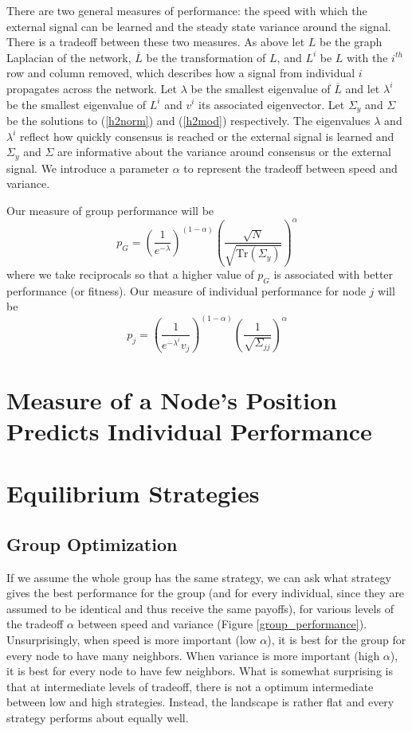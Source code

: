 \documentclass{article}
\newcommand{\Tr}{\text{Tr}}
\begin{document}
There are two general measures of performance: the speed with which the external signal can be learned and the steady state variance around the signal.  There is a tradeoff between these two measures.  As above let $L$ be the graph Laplacian of the network, $\overline{L}$ be the transformation of $L$, and $L^i$ be $L$ with the $i^{th}$ row and column removed, which describes how  a signal from individual $i$ propagates across the network.  Let $\lambda$ be the smallest eigenvalue of $\overline{L}$ and let $\lambda^i$ be the smallest eigenvalue of $L^i$ and $v^i$ its associated eigenvector.  Let $\Sigma_y$ and $\Sigma$ be the solutions to (\ref{h2norm}) and (\ref{h2mod}) respectively.  The eigenvalues $\lambda$ and $\lambda^i$ reflect how quickly consensus is reached or the external signal is learned and $\Sigma_y$ and $\Sigma$ are informative about the variance around consensus or the external signal.   We introduce a parameter $\alpha$ to represent the tradeoff between speed and variance.  

Our measure of group performance will be 
\begin{equation}
p_G=\left(\frac{1}{e^{-\lambda}}\right)^{(1-\alpha)}\left(\frac{\sqrt{N}}{\sqrt{\Tr(\Sigma_y)}}\right)^\alpha  \label{groupperf}
\end{equation}
where we take reciprocals so that a higher value of $p_G$ is associated with better performance (or fitness).  Our measure of individual performance for node $j$ will be 
\begin{equation}
p_j=\left(\frac{1}{e^{-\lambda^i}v_j}\right)^{(1-\alpha)}\left(\frac{1}{\sqrt{\Sigma_{jj}}}\right)^\alpha  \label{indperf}
\end{equation}



\section{Measure of a Node's Position Predicts Individual Performance }


\section{Equilibrium Strategies}

\subsection{Group Optimization }

If we assume the whole group has the same strategy, we can ask what strategy gives the best performance for the group (and for every individual, since they are assumed to be identical and thus receive the same payoffs), for various levels of the tradeoff $\alpha$ between speed and variance (Figure \ref{group_performance}).  Unsurprisingly, when speed is more important (low $\alpha$), it is best for the group for every node to have many neighbors.  When variance is more important (high $\alpha$), it is best for every node to have few neighbors.  What is somewhat surprising is that at intermediate levels of tradeoff, there is not a optimum intermediate between low and high strategies.  Instead, the landscape is rather flat and every strategy performs about equally well.
\end{document}
